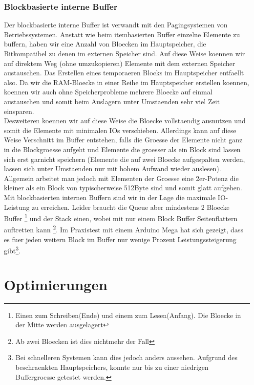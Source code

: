\documentclass[10pt,a4paper]{article}
\begin{document}
\subsubsection{Blockbasierte interne Buffer}
Der blockbasierte interne Buffer ist verwandt mit den Pagingsystemen von Betriebssystemen. Anstatt wie beim itembasierten Buffer einzelne Elemente zu buffern, haben wir eine Anzahl von Bloecken im Hauptspeicher, die Bitkompatibel zu denen im externen Speicher sind. Auf diese Weise koennen wir auf direktem Weg (ohne umzukopieren) Elemente mit dem externen Speicher austauschen. Das Erstellen eines temporaeren Blocks im Hauptspeicher entfaellt also. Da wir die RAM-Bloecke in einer Reihe im Hauptspeicher erstellen koennen, koennen wir auch ohne Speicherprobleme mehrere Bloecke auf einmal austauschen und somit beim Auslagern unter Umstaenden sehr viel Zeit einsparen.\\
Desweiteren koennen wir auf diese Weise die Bloecke vollstaendig ausnutzen und somit die Elemente mit minimalen IOs verschieben. Allerdings kann auf diese Weise Verschnitt im Buffer entstehen, falls die Groesse der Elemente nicht ganz in die Blockgroesse aufgeht und Elemente die groesser als ein Block sind lassen sich erst garnicht speichern (Elemente die auf zwei Bloecke aufgespalten werden, lassen sich unter Umstaenden nur mit hohem Aufwand wieder auslesen). Allgemein arbeitet man jedoch mit Elementen der Groesse eine 2er-Potenz die kleiner als ein Block von typischerweise 512Byte sind und somit glatt aufgehen.
Mit blockbasierten internen Buffern sind wir in der Lage die maximale IO-Leistung zu erreichen. Leider braucht die Queue aber mindestens 2 Bloecke Buffer \footnote{Einen zum Schreiben(Ende) und einem zum Lesen(Anfang). Die Bloecke in der Mitte werden ausgelagert} und der Stack einen, wobei mit nur einem Block Buffer Seitenflattern auftretten kann \footnote{Ab zwei Bloecken ist dies nichtmehr der Fall}. Im Praxistest mit einem Arduino Mega hat sich gezeigt, dass es fuer jeden weitern Block im Buffer nur wenige Prozent Leistungssteigerung gibt\footnote{Bei schnelleren Systemen kann dies jedoch anders aussehen. Aufgrund des beschraenkten Hauptspeichers, konnte nur bis zu einer niedrigen Buffergroesse getestet werden.}. 
\section{Optimierungen}
\end{document}
